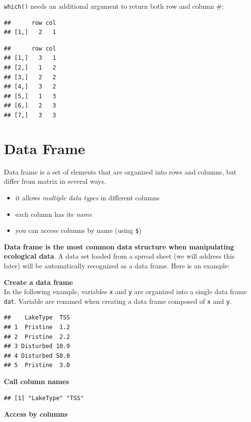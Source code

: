 \documentclass[
]{book}
\providecommand{\tightlist}{%
  \setlength{\itemsep}{0pt}\setlength{\parskip}{0pt}}
\begin{document}
\texttt{which()} needs an additional argument to return both row and column \#:

\begin{verbatim}
##      row col
## [1,]   2   1
\end{verbatim}

\begin{verbatim}
##      row col
## [1,]   3   1
## [2,]   1   2
## [3,]   2   2
## [4,]   3   2
## [5,]   1   3
## [6,]   2   3
## [7,]   3   3
\end{verbatim}

\hypertarget{data-frame}{%
\section{Data Frame}\label{data-frame}}

Data frame is a set of elements that are organized into rows and columns, but differ from matrix in several ways.

\begin{itemize}
\tightlist
\item
  it allows \emph{multiple data types} in different columns
\item
  each column has its \emph{name}
\item
  you can access columns by name (using \texttt{\$})
\end{itemize}

\textbf{Data frame is the most common data structure when manipulating ecological data}. A data set loaded from a spread sheet (we will address this later) will be automatically recognized as a data frame. Here is an example:

\textbf{Create a data frame}\\
In the following example, variables \texttt{x} and \texttt{y} are organized into a single data frame \texttt{dat}. Variable are renamed when creating a data frame composed of \texttt{x} and \texttt{y}.

\begin{verbatim}
##    LakeType  TSS
## 1  Pristine  1.2
## 2  Pristine  2.2
## 3 Disturbed 10.9
## 4 Disturbed 50.0
## 5  Pristine  3.0
\end{verbatim}

\textbf{Call column names}\\

\begin{verbatim}
## [1] "LakeType" "TSS"
\end{verbatim}

\textbf{Access by columns}\\
\end{document}
